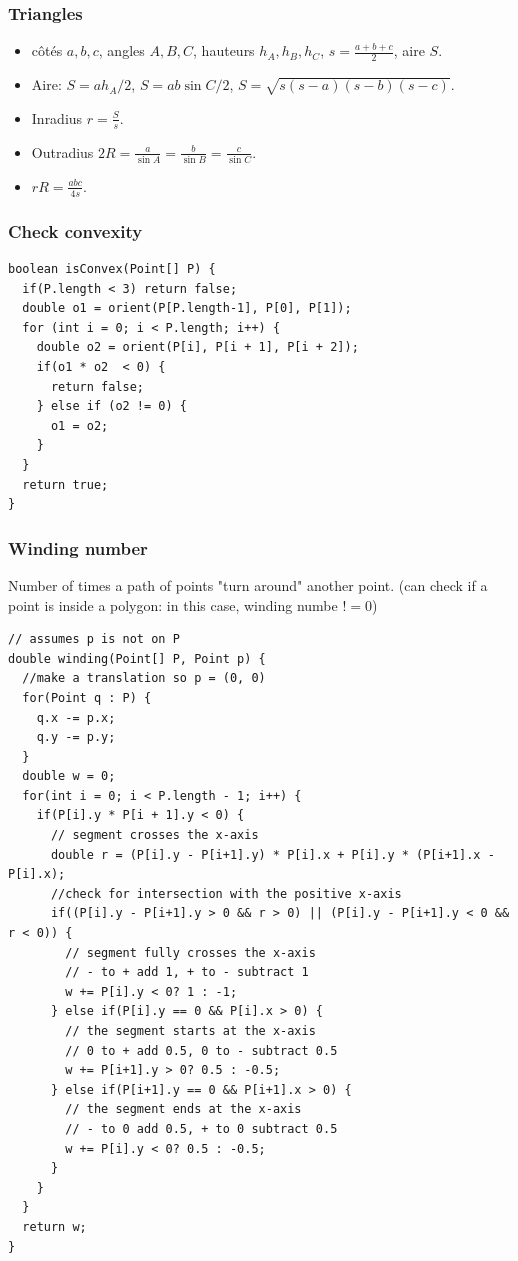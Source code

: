 \subsubsection{Triangles}
\begin{itemize}
  \item côtés $a,b,c$, angles $A,B,C$, hauteurs $h_A,h_B,h_C$, $s=\frac{a+b+c}{2}$, aire $S$.
  \item Aire: $S=ah_A/2$, $S=ab\sin C/2$, $S=\sqrt{s(s-a)(s-b)(s-c)}$.
  \item Inradius $r=\frac{S}{s}$.
  \item Outradius $2R = \frac{a}{\sin A} = \frac{b}{\sin B} = \frac{c}{\sin C}$.
  \item $rR = \frac{abc}{4s}$.
\end{itemize}
\subsubsection{Check convexity}
\begin{lstlisting}
boolean isConvex(Point[] P) {
  if(P.length < 3) return false;
  double o1 = orient(P[P.length-1], P[0], P[1]);
  for (int i = 0; i < P.length; i++) {
    double o2 = orient(P[i], P[i + 1], P[i + 2]);
    if(o1 * o2  < 0) {
      return false;
    } else if (o2 != 0) {
      o1 = o2;
    }
  }
  return true;
}
\end{lstlisting}
\subsubsection{Winding number}
Number of times a path of points "turn around" another point. (can check if a point is inside a polygon: in this case, winding numbe $!=0$)
\begin{lstlisting}
// assumes p is not on P
double winding(Point[] P, Point p) {
  //make a translation so p = (0, 0)
  for(Point q : P) {
    q.x -= p.x;
    q.y -= p.y;
  }
  double w = 0;
  for(int i = 0; i < P.length - 1; i++) {
    if(P[i].y * P[i + 1].y < 0) {
      // segment crosses the x-axis
      double r = (P[i].y - P[i+1].y) * P[i].x + P[i].y * (P[i+1].x - P[i].x);
      //check for intersection with the positive x-axis
      if((P[i].y - P[i+1].y > 0 && r > 0) || (P[i].y - P[i+1].y < 0 && r < 0)) {
        // segment fully crosses the x-axis
        // - to + add 1, + to - subtract 1
        w += P[i].y < 0? 1 : -1;
      } else if(P[i].y == 0 && P[i].x > 0) {
        // the segment starts at the x-axis
        // 0 to + add 0.5, 0 to - subtract 0.5
        w += P[i+1].y > 0? 0.5 : -0.5;
      } else if(P[i+1].y == 0 && P[i+1].x > 0) {
        // the segment ends at the x-axis
        // - to 0 add 0.5, + to 0 subtract 0.5
        w += P[i].y < 0? 0.5 : -0.5;
      }
    }
  }
  return w;
}
\end{lstlisting}

